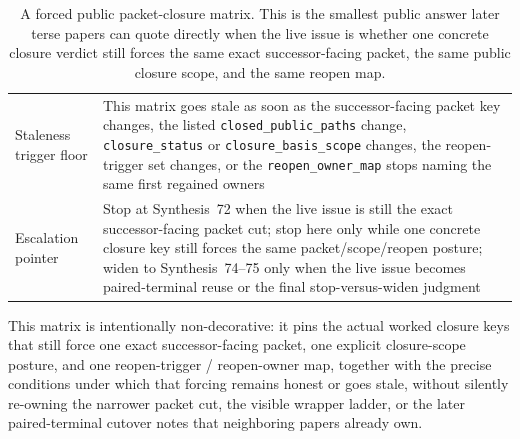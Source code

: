 \documentclass[11pt]{article}
\begin{document}
\begin{table}[t]
\begin{tabularx}{\linewidth}{@{}lX@{}}
Staleness trigger floor & This matrix goes stale as soon as the successor-facing packet key changes, the listed \nolinkurl{closed_public_paths} change, \nolinkurl{closure_status} or \nolinkurl{closure_basis_scope} changes, the reopen-trigger set changes, or the \nolinkurl{reopen_owner_map} stops naming the same first regained owners \\
Escalation pointer & Stop at Synthesis~72 when the live issue is still the exact successor-facing packet cut; stop here only while one concrete closure key still forces the same packet/scope/reopen posture; widen to Synthesis~74--75 only when the live issue becomes paired-terminal reuse or the final stop-versus-widen judgment \\
\bottomrule
\end{tabularx}
\caption{A forced public packet-closure matrix. This is the smallest public answer later terse papers can quote directly when the live issue is whether one concrete closure verdict still forces the same exact successor-facing packet, the same public closure scope, and the same reopen map.}
\label{tab:forced-public-packet-closure-matrix}
\end{table}

This matrix is intentionally non-decorative: it pins the actual worked closure keys that still force one exact successor-facing packet, one explicit closure-scope posture, and one reopen-trigger / reopen-owner map, together with the precise conditions under which that forcing remains honest or goes stale, without silently re-owning the narrower packet cut, the visible wrapper ladder, or the later paired-terminal cutover notes that neighboring papers already own.\cite{series:workedexample}
\end{document}
